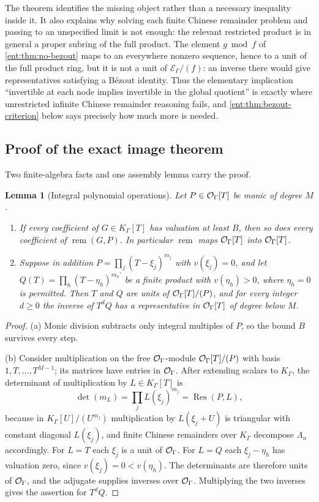 \documentclass[11pt]{article}
\theoremstyle{plain}
\newtheorem{lemma}[lemma]{Lemma}
\theoremstyle{plain}
\theoremstyle{plain}
\theoremstyle{definition}
\theoremstyle{definition}
\theoremstyle{definition}
\theoremstyle{definition}
\theoremstyle{remark}
\newcommand{\K}{K_\Gamma}\newcommand{\KD}{K_\Delta}
\newcommand{\E}{\mathcal E_\Gamma}
\DeclareMathOperator{\remp}{rem}\DeclareMathOperator{\Res}{Res}
\begin{document}
The theorem identifies the missing object rather than a necessary inequality
inside it. It also explains why solving each finite Chinese remainder problem
and passing to an unspecified limit is not enough: the relevant restricted
product is in general a proper subring of the full product. The element
$g\bmod f$ of \cref{ent:thm:no-bezout} maps to an everywhere nonzero
sequence, hence to a unit of the full product ring, but it is not a unit of
$\E/(f)$: an inverse there would give representatives satisfying a B\'ezout
identity. Thus the elementary implication ``invertible at each node implies
invertible in the global quotient'' is exactly where unrestricted infinite
Chinese remainder reasoning fails, and \cref{ent:thm:bezout-criterion} below
says precisely how much more is needed.

\subsection{Proof of the exact image theorem}
\label{ent:subsec:image-proof}
Two finite-algebra facts and one assembly lemma carry the proof.

\begin{lemma}[Integral polynomial operations]\label{ent:lem:integral}
Let $P\in\mathcal O_\Gamma[T]$ be monic of degree $M$.
\begin{enumerate}[label=\textnormal{(\alph*)},leftmargin=2em]
\item If every coefficient of $G\in\K[T]$ has valuation at least $B$, then so
does every coefficient of $\remp(G,P)$. In particular $\remp$ maps $\mathcal O_\Gamma[T]$
into $\mathcal O_\Gamma[T]$.
\item Suppose in addition $P=\prod_j(T-\xi_j)^{m_j}$ with $v(\xi_j)=0$, and
let $Q(T)=\prod_h(T-\eta_h)^{m_h'}$ be a finite product with $v(\eta_h)>0$,
where $\eta_h=0$ is permitted. Then $T$ and $Q$ are units of $\mathcal O_\Gamma[T]/(P)$,
and for every integer $d\ge0$ the inverse of $T^dQ$ has a representative in
$\mathcal O_\Gamma[T]$ of degree below $M$.
\end{enumerate}
\end{lemma}
\begin{proof}
(a) Monic division subtracts only integral multiples of $P$, so the bound $B$
survives every step.

(b) Consider multiplication on the free $\mathcal O_\Gamma$-module $\mathcal O_\Gamma[T]/(P)$ with basis
$1,T,\ldots,T^{M-1}$; its matrices have entries in $\mathcal O_\Gamma$. After extending
scalars to $\K$, the determinant of multiplication by $L\in\K[T]$ is
\begin{equation}\label{ent:eq:detnorm}
 \det(m_L)=\prod_jL(\xi_j)^{m_j}=\Res(P,L),
\end{equation}
because in $\K[U]/(U^{m_j})$ multiplication by $L(\xi_j+U)$ is triangular
with constant diagonal $L(\xi_j)$, and finite Chinese remainders over $\K$
decompose $\Lambda_n$ accordingly. For $L=T$ each $\xi_j$ is a unit of $\mathcal O_\Gamma$.
For $L=Q$ each $\xi_j-\eta_h$ has valuation zero, since $v(\xi_j)=0<v(\eta_h)$.
The determinants are therefore units of $\mathcal O_\Gamma$, and the adjugate supplies
inverses over $\mathcal O_\Gamma$. Multiplying the two inverses gives the assertion for
$T^dQ$.
\end{proof}
\end{document}
